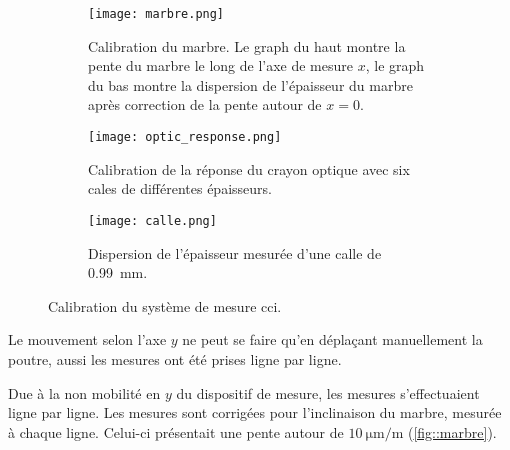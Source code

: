                    \begin{figure}[htpb]
                        \begin{minipage}{0.56\textwidth}
                           \begin{subfigure}[t]{\textwidth} \texttt{[image: marbre.png]}
                            \caption[Calibration du marbre.]{Calibration du marbre. Le graph du haut montre la pente du marbre le long de l'axe de mesure $x$, le graph du bas montre la dispersion de l'épaisseur du marbre après correction de la pente autour de $x=0$.}
                            \label{fig::marbre}
                            \end{subfigure}
                        \end{minipage}
                        \hfill
                        \begin{minipage}{0.38\textwidth}
                            \begin{subfigure}[t]{\textwidth}
                                \texttt{[image: optic\_response.png]}
                                \caption[Calibration de la réponse du crayon optique.]{Calibration de la réponse du crayon optique avec six cales de différentes épaisseurs.}
                                \label{fig::optic_response}
                            \end{subfigure}
                            \begin{subfigure}[t]{\textwidth}
                                \texttt{[image: calle.png]}
                                \caption[Dispersion de l'épaisseur mesurée d'une calle de \SI{0.99}{\milli\meter}.]{Dispersion de l'épaisseur mesurée d'une calle de \SI{0.99}{\milli\meter}.}
                                \label{fig::calle}
                            \end{subfigure}
                        \end{minipage}
                        \caption[Calibration du système de mesure \gls{cci}.]{Calibration du système de mesure \gls{cci}.}
                        \label{fig::calibration}
                    \end{figure}
                    Le mouvement selon l'axe $y$ ne peut se faire qu'en déplaçant manuellement la poutre, aussi les mesures ont été prises ligne par ligne.
                    
                    Due à la non mobilité en $y$ du dispositif de mesure, les mesures s'effectuaient ligne par ligne. Les mesures sont corrigées pour l'inclinaison du marbre, mesurée à chaque ligne. Celui-ci présentait une pente autour de $\SI{10}{\micro\meter\per\meter}$ (\autoref{fig::marbre}).
                    
